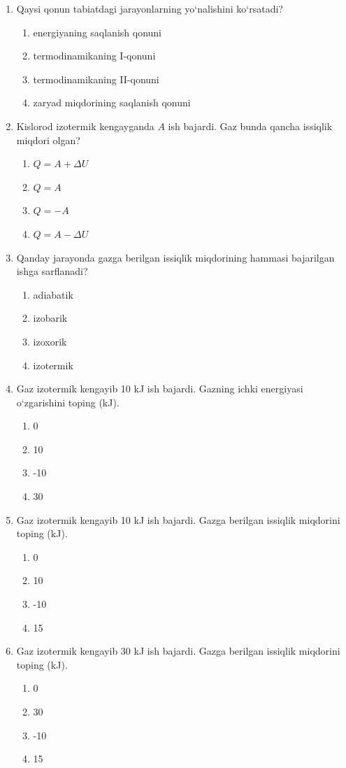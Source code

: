 \begin{enumerate}
\item Qaysi qonun tabiatdagi jarayonlarning yo‘nalishini ko‘rsatadi?
\begin{enumerate}[label=\Alph*)]
\item energiyaning saqlanish qonuni
\item termodinamikaning I-qonuni
\item termodinamikaning II-qonuni
\item zaryad miqdorining saqlanish qonuni
\end{enumerate}

\item Kislorod izotermik kengayganda $A$ ish bajardi. Gaz bunda qancha issiqlik miqdori olgan?
\begin{enumerate}[label=\Alph*)]
\item $Q = A + \Delta U$
\item $Q = A$
\item $Q = -A$
\item $Q = A - \Delta U$
\end{enumerate}

\item Qanday jarayonda gazga berilgan issiqlik miqdorining hammasi bajarilgan ishga sarflanadi?
\begin{enumerate}[label=\Alph*)]
\item adiabatik
\item izobarik
\item izoxorik
\item izotermik
\end{enumerate}

\item Gaz izotermik kengayib 10 kJ ish bajardi. Gazning ichki energiyasi o‘zgarishini toping (kJ).
\begin{enumerate}[label=\Alph*)]
\item 0
\item 10
\item -10
\item 30
\end{enumerate}

\item Gaz izotermik kengayib 10 kJ ish bajardi. Gazga berilgan issiqlik miqdorini toping (kJ).
\begin{enumerate}[label=\Alph*)]
\item 0
\item 10
\item -10
\item 15
\end{enumerate}

\item Gaz izotermik kengayib 30 kJ ish bajardi. Gazga berilgan issiqlik miqdorini toping (kJ).
\begin{enumerate}[label=\Alph*)]
\item 0
\item 30
\item -10
\item 15
\end{enumerate}



\end{enumerate}
